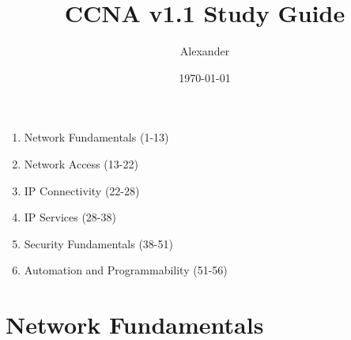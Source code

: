 \documentclass{article}
\title{CCNA v1.1 Study Guide}
\author{Alexander}
\date{\today}
\begin{document}
\maketitle

\begin{enumerate}
  \item Network Fundamentals (1-13)
  \item Network Access (13-22)
  \item IP Connectivity (22-28)
  \item IP Services (28-38)
  \item Security Fundamentals (38-51)
  \item Automation and Programmability (51-56)
\end{enumerate}

\section{Network Fundamentals}
\end{document}
